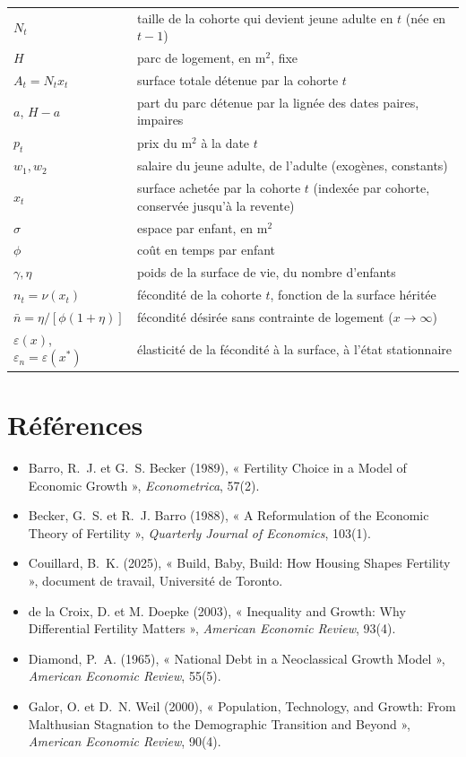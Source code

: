 \documentclass[11pt,a4paper]{article}
\theoremstyle{plain}
\theoremstyle{definition}
\newcommand{\eps}{\varepsilon}
\begin{document}
\begin{center}\small
\begin{tabular}{@{}ll@{}}
\toprule
$N_t$ & taille de la cohorte qui devient jeune adulte en $t$ (née en $t-1$) \\
$H$ & parc de logement, en m$^2$, fixe \\
$A_t = N_t x_t$ & surface totale détenue par la cohorte $t$ \\
$a$, $H-a$ & part du parc détenue par la lignée des dates paires, impaires \\
$p_t$ & prix du m$^2$ à la date $t$ \\
$w_1, w_2$ & salaire du jeune adulte, de l'adulte (exogènes, constants) \\
$x_t$ & surface achetée par la cohorte $t$ (indexée par cohorte, conservée jusqu'à la revente) \\
$\sigma$ & espace par enfant, en m$^2$ \\
$\phi$ & coût en temps par enfant \\
$\gamma, \eta$ & poids de la surface de vie, du nombre d'enfants \\
$n_t = \nu(x_t)$ & fécondité de la cohorte $t$, fonction de la surface héritée \\
$\bar n = \eta/[\phi(1+\eta)]$ & fécondité désirée sans contrainte de logement ($x\to\infty$) \\
$\eps(x)$, $\eps_n = \eps(x^*)$ & élasticité de la fécondité à la surface, à l'état stationnaire \\
\bottomrule
\end{tabular}
\end{center}

\section*{Références}
\begin{itemize}\setlength{\itemsep}{0.2em}
\item Barro, R.~J. et G.~S. Becker (1989), « Fertility Choice in a Model of Economic Growth », \emph{Econometrica}, 57(2).
\item Becker, G.~S. et R.~J. Barro (1988), « A Reformulation of the Economic Theory of Fertility », \emph{Quarterly Journal of Economics}, 103(1).
\item Couillard, B.~K. (2025), « Build, Baby, Build: How Housing Shapes Fertility », document de travail, Université de Toronto.
\item de la Croix, D. et M. Doepke (2003), « Inequality and Growth: Why Differential Fertility Matters », \emph{American Economic Review}, 93(4).
\item Diamond, P.~A. (1965), « National Debt in a Neoclassical Growth Model », \emph{American Economic Review}, 55(5).
\item Galor, O. et D.~N. Weil (2000), « Population, Technology, and Growth: From Malthusian Stagnation to the Demographic Transition and Beyond », \emph{American Economic Review}, 90(4).
\end{itemize}
\end{document}
